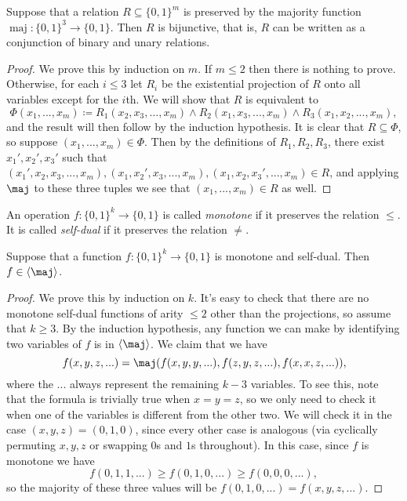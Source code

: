 \begin{thm} Suppose that a relation $R \subseteq \{0,1\}^m$ is preserved by the majority function $\operatorname{maj} : \{0,1\}^3 \rightarrow \{0,1\}$. Then $R$ is bijunctive, that is, $R$ can be written as a conjunction of binary and unary relations.
\end{thm}
\begin{proof} We prove this by induction on $m$. If $m \le 2$ then there is nothing to prove. Otherwise, for each $i \le 3$ let $R_i$ be the existential projection of $R$ onto all variables except for the $i$th. We will show that $R$ is equivalent to
\[
\Phi(x_1, ..., x_m) \coloneqq R_1(x_2, x_3, ..., x_m) \wedge R_2(x_1,x_3, ..., x_m) \wedge R_3(x_1,x_2,...,x_m),
\]
and the result will then follow by the induction hypothesis. It is clear that $R \subseteq \Phi$, so suppose $(x_1, ..., x_m) \in \Phi$. Then by the definitions of $R_1, R_2, R_3$, there exist $x_1', x_2', x_3'$ such that $(x_1',x_2,x_3,...,x_m), (x_1,x_2',x_3,...,x_m), (x_1,x_2,x_3',...,x_m) \in R$, and applying $\maj$ to these three tuples we see that $(x_1, ..., x_m) \in R$ as well.
\end{proof}

\begin{defn} An operation $f : \{0,1\}^k \rightarrow \{0,1\}$ is called \emph{monotone} if it preserves the relation $\le$. It is called \emph{self-dual} if it preserves the relation $\ne$.
\end{defn}

\begin{thm} Suppose that a function $f : \{0,1\}^k \rightarrow \{0,1\}$ is monotone and self-dual. Then $f \in \langle \maj \rangle$.
\end{thm}
\begin{proof} We prove this by induction on $k$. It's easy to check that there are no monotone self-dual functions of arity $\le 2$ other than the projections, so assume that $k \ge 3$. By the induction hypothesis, any function we can make by identifying two variables of $f$ is in $\langle \maj \rangle$. We claim that we have
\[
f(x,y,z,...) = \maj(f(x,y,y,...), f(z,y,z,...), f(x,x,z,...)),
\]
where the $...$ always represent the remaining $k-3$ variables. To see this, note that the formula is trivially true when $x=y=z$, so we only need to check it when one of the variables is different from the other two. We will check it in the case $(x,y,z) = (0,1,0)$, since every other case is analogous (via cyclically permuting $x,y,z$ or swapping $0$s and $1$s throughout). In this case, since $f$ is monotone we have
\[
f(0,1,1,...) \ge f(0,1,0, ...) \ge f(0,0,0,...),
\]
so the majority of these three values will be $f(0,1,0,...) = f(x,y,z,...)$.
\end{proof}

